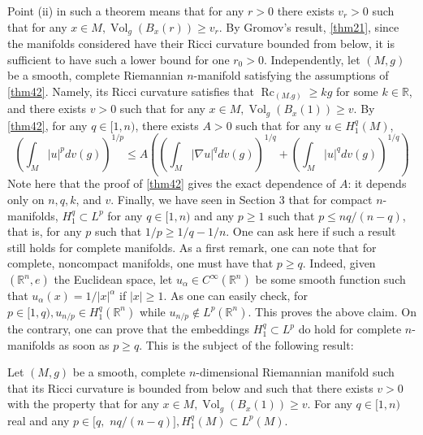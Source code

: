 \documentclass[12pt,hyperref,a4paper,UTF8]{ctexart}
\begin{document}
Point (ii) in such a theorem means that for any $r>0$ there exists $v_r>0$ such that for any $x \in M, \operatorname{Vol}_g\left(B_x(r)\right) \geq v_r$. By Gromov's result, \autoref{thm21}, since the manifolds considered have their Ricci curvature bounded from below, it is sufficient to have such a lower bound for one $r_0>0$. Independently, let $(M, g)$ be a smooth, complete Riemannian $n$-manifold satisfying the assumptions of \autoref{thm42}. Namely, its Ricci curvature satisfies that $\operatorname{Rc}_{(M . g)} \geq k g$ for some $k \in \mathbb{R}$, and there exists $v>0$ such that for any $x \in M, \operatorname{Vol}_g\left(B_x(1)\right) \geq v$. By \autoref{thm42}, for any $q \in[1, n)$, there exists $A>0$ such that for any $u \in H_1^q(M)$,
$$
\left(\int_M|u|^p d v(g)\right)^{1 / p} \leq A\left(\left(\int_M|\nabla u|^q d v(g)\right)^{1 / q}+\left(\int_M|u|^q d v(g)\right)^{1 / q}\right)
$$
Note here that the proof of \autoref{thm42} gives the exact dependence of $A$: it depends only on $n, q, k$, and $v$. Finally, we have seen in Section 3 that for compact $n$-manifolds, $H_1^q \subset L^p$ for any $q \in[1, n)$ and any $p \geq 1$ such that $p \leq n q /(n-q)$, that is, for any $p$ such that $1 / p \geq 1 / q-1 / n$. One can ask here if such a result still holds for complete manifolds. As a first remark, one can note that for complete, noncompact manifolds, one must have that $p \geq q$. Indeed, given $\left(\mathbb{R}^n, e\right)$ the Euclidean space, let $u_\alpha \in C^{\infty}\left(\mathbb{R}^n\right)$ be some smooth function such that $u_\alpha(x)=1 /|x|^\alpha$ if $|x| \geq 1$. As one can easily check, for $p \in[1, q), u_{n / p} \in H_1^q\left(\mathbb{R}^n\right)$ while $u_{n / p} \notin L^p\left(\mathbb{R}^n\right)$. This proves the above claim. On the contrary, one can prove that the embeddings $H_1^q \subset L^p$ do hold for complete $n$-manifolds as soon as $p \geq q$. This is the subject of the following result:

\begin{Proposition}
Let $(M, g)$ be a smooth, complete $n$-dimensional Riemannian manifold such that its Ricci curvature is bounded from below and such that there exists $v>0$ with the property that for any $x \in M, \operatorname{Vol}_g\left(B_x(1)\right) \geq v$. For any $q \in[1, n)$ real and any $p \in[q,$ $n q /(n-q)], H_1^q(M) \subset L^p(M)$.
\label{prp45}
\end{Proposition}
\end{document}
